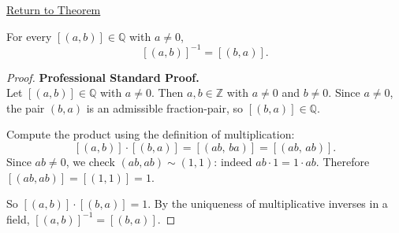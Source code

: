 \newpage
{}
\label{prf:ec-reciprocal}

\begin{remark*}[Return]
\hyperref[thm:ec-reciprocal]{Return to Theorem}
\end{remark*}

\begin{theorem*}
For every $[(a,b)]\in\mathbb{Q}$ with $a\neq 0$,
\[
[(a,b)]^{-1} = [(b,a)].
\]
\end{theorem*}

\begin{proof}
\textbf{Professional Standard Proof.}~\\
Let $[(a,b)]\in\mathbb{Q}$ with $a\neq 0$. Then $a,b\in\mathbb{Z}$ with
$a\neq 0$ and $b\neq 0$. Since $a\neq 0$, the pair $(b,a)$ is an
admissible fraction-pair, so $[(b,a)]\in\mathbb{Q}$.

Compute the product using the definition of multiplication:
\[
[(a,b)]\cdot[(b,a)]
= [(ab,\,ba)]
= [(ab,\,ab)].
\]
Since $ab \neq 0$, we check $(ab,ab)\sim(1,1)$: indeed $ab\cdot 1 = 1\cdot ab$.
Therefore $[(ab,ab)] = [(1,1)] = 1$.

So $[(a,b)]\cdot[(b,a)] = 1$. By the uniqueness of multiplicative inverses
in a field, $[(a,b)]^{-1} = [(b,a)]$.
\end{proof}

